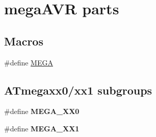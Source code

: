 \hypertarget{group__mega__part__macros__group}{}\section{mega\+A\+V\+R parts}
\label{group__mega__part__macros__group}
\subsection*{Macros}
\begin{DoxyCompactItemize}
\item 
\#define \hyperlink{group__mega__part__macros__group_ga78a6115b485de47c7cc56b224c558ea2}{M\+E\+G\+A}
\end{DoxyCompactItemize}
\subsection*{A\+Tmegaxx0/xx1 subgroups}
\begin{DoxyCompactItemize}
\item 
\#define {\bfseries M\+E\+G\+A\+\_\+\+X\+X0}
\item 
\#define {\bfseries M\+E\+G\+A\+\_\+\+X\+X1}
\end{DoxyCompactItemize}
